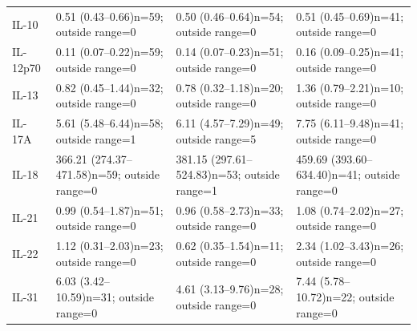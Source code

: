 {\begin{longtable}{p{22mm}p{45mm}p{45mm}p{45mm}}
IL-10 & 0.51 (0.43--0.66)\newline n=59; outside range=0 & 0.50 (0.46--0.64)\newline n=54; outside range=0 & 0.51 (0.45--0.69)\newline n=41; outside range=0 \\[4pt]
IL-12p70 & 0.11 (0.07--0.22)\newline n=59; outside range=0 & 0.14 (0.07--0.23)\newline n=51; outside range=0 & 0.16 (0.09--0.25)\newline n=41; outside range=0 \\[4pt]
IL-13 & 0.82 (0.45--1.44)\newline n=32; outside range=0 & 0.78 (0.32--1.18)\newline n=20; outside range=0 & 1.36 (0.79--2.21)\newline n=10; outside range=0 \\[4pt]
IL-17A & 5.61 (5.48--6.44)\newline n=58; outside range=1 & 6.11 (4.57--7.29)\newline n=49; outside range=5 & 7.75 (6.11--9.48)\newline n=41; outside range=0 \\[4pt]
IL-18 & 366.21 (274.37--471.58)\newline n=59; outside range=0 & 381.15 (297.61--524.83)\newline n=53; outside range=1 & 459.69 (393.60--634.40)\newline n=41; outside range=0 \\[4pt]
IL-21 & 0.99 (0.54--1.87)\newline n=51; outside range=0 & 0.96 (0.58--2.73)\newline n=33; outside range=0 & 1.08 (0.74--2.02)\newline n=27; outside range=0 \\[4pt]
IL-22 & 1.12 (0.31--2.03)\newline n=23; outside range=0 & 0.62 (0.35--1.54)\newline n=11; outside range=0 & 2.34 (1.02--3.43)\newline n=26; outside range=0 \\[4pt]
IL-31 & 6.03 (3.42--10.59)\newline n=31; outside range=0 & 4.61 (3.13--9.76)\newline n=28; outside range=0 & 7.44 (5.78--10.72)\newline n=22; outside range=0 \\[4pt]

\end{longtable}}
